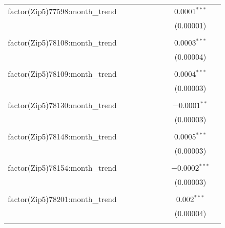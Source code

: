 \begin{table}[H]
{\begin{tabular}{@{\extracolsep{5pt}}lcccccccc}
  factor(Zip5)77598:month\_trend &  &  &  &  &  &  & 0.0001$^{***}$ &  \\  

   &  &  &  &  &  &  & (0.00001) &  \\  

   & & & & & & & & \\  

  factor(Zip5)78108:month\_trend &  &  &  &  &  &  & 0.0003$^{***}$ &  \\  

   &  &  &  &  &  &  & (0.00004) &  \\  

   & & & & & & & & \\  

  factor(Zip5)78109:month\_trend &  &  &  &  &  &  & 0.0004$^{***}$ &  \\  

   &  &  &  &  &  &  & (0.00003) &  \\  

   & & & & & & & & \\  

  factor(Zip5)78130:month\_trend &  &  &  &  &  &  & $-$0.0001$^{**}$ &  \\  

   &  &  &  &  &  &  & (0.00003) &  \\  

   & & & & & & & & \\  

  factor(Zip5)78148:month\_trend &  &  &  &  &  &  & 0.0005$^{***}$ &  \\  

   &  &  &  &  &  &  & (0.00003) &  \\  

   & & & & & & & & \\  

  factor(Zip5)78154:month\_trend &  &  &  &  &  &  & $-$0.0002$^{***}$ &  \\  

   &  &  &  &  &  &  & (0.00003) &  \\  

   & & & & & & & & \\  

  factor(Zip5)78201:month\_trend &  &  &  &  &  &  & 0.002$^{***}$ &  \\  

   &  &  &  &  &  &  & (0.00004) &  \\  

   & & & & & & & & \\  


\end{tabular}}
\end{table}
